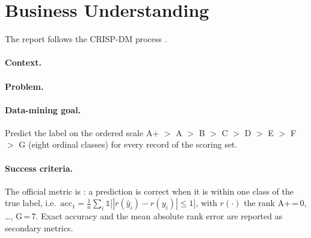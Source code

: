 \section{Business Understanding}
\label{sec:business}
The report follows the CRISP-DM process \citep{chapman2000crisp}.

\paragraph{Context.}

\paragraph{Problem.}

\paragraph{Data-mining goal.}
Predict the \epc{} label on the ordered scale
A+ $>$ A $>$ B $>$ C $>$ D $>$ E $>$ F $>$ G (eight ordinal classes)
for every record of the scoring set.

\paragraph{Success criteria.}
The official metric is \onenotch{}: a prediction is correct when it is
within one class of the true label, i.e.\
$\text{acc}_{1} = \frac{1}{n}\sum_i \mathbb{1}\big[|r(\hat y_i) - r(y_i)| \le 1\big]$,
with $r(\cdot)$ the rank A+\,=\,0, \dots, G\,=\,7.
Exact accuracy and the mean absolute rank error are reported as secondary metrics.

